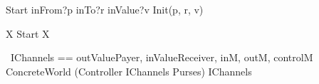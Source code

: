 \documentclass{article}
\begin{document}
\begin{circusaction}
      Start \circdef inFrom?p \then inTo?r \then inValue?v \then Init(p, r, v)
\end{circusaction}

\begin{circusaction}
    \circspot \circmu X \circspot Start \circseq X
\end{circusaction}

\begin{circus}
    \circend
\end{circus}

\begin{circus}
      \circchannelset\ IChannels == \lchanset outValuePayer, inValueReceiver, inM, outM, controlM \rchanset \\
      \circprocess ConcreteWorld \circdef (Controller \lpar IChannels \rpar Purses) \circhide IChannels
\end{circus}
\end{document}
